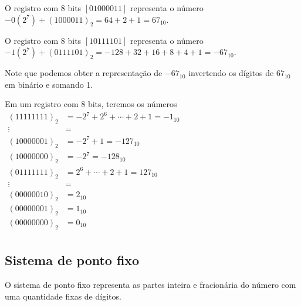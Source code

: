\begin{ex}
 O registro com $8$ bits $[01000011]$ representa o número
 $-0(2^7)+(1000011)_2=64+2+1=67_{10}$.

 O registro com $8$ bits $[10111101]$ representa o número
 $-1(2^7)+(0111101)_2=-128+ 32+16+8+4+1=-67_{10}$.

 Note que podemos obter a representação de $-67_{10}$ invertendo os dígitos de $67_{10}$ em binário e somando 1.
\end{ex}

\begin{ex}
Em um registro com $8$ bits, teremos os números
$
\begin{array}{cl}
 (11111111)_2 &= -2^7+2^{6}+\cdots+2+1=-1_{10}\\
     \vdots   &=  \\
 (10000001)_2 &= -2^7+1 = -127_{10} \\
 (10000000)_2 &= -2^7   = -128_{10} \\
 (01111111)_2 &= 2^6+\cdots+2+1=127_{10} \\
     \vdots    &=  \\
 (00000010)_2 &= 2_{10} \\
 (00000001)_2 &= 1_{10} \\
 (00000000)_2 &= 0_{10} \\
\end{array}
$
\end{ex}





\subsection{Sistema de ponto fixo}
O sistema de ponto fixo representa as partes inteira e fracionária do número com uma quantidade fixas de dígitos. 

